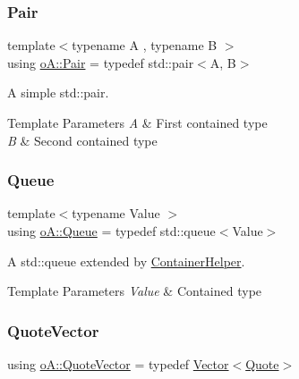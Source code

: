 \mbox{\label{namespaceo_a_a2e4add9f777dcae3f5afde9e90c75b66}} 
\subsubsection{\texorpdfstring{Pair}{Pair}}
{\footnotesize\ttfamily template$<$typename A , typename B $>$ \\
using \mbox{\hyperlink{namespaceo_a_a2e4add9f777dcae3f5afde9e90c75b66}{o\+A\+::\+Pair}} = typedef std\+::pair$<$A, B$>$}



A simple std\+::pair. 


\begin{DoxyTemplParams}{Template Parameters}
{\em A} & First contained type \\
\hline
{\em B} & Second contained type \\
\hline
\end{DoxyTemplParams}
\mbox{\label{namespaceo_a_a797c449312e4921e82e3f05a2562bb97}} 
\subsubsection{\texorpdfstring{Queue}{Queue}}
{\footnotesize\ttfamily template$<$typename Value $>$ \\
using \mbox{\hyperlink{namespaceo_a_a797c449312e4921e82e3f05a2562bb97}{o\+A\+::\+Queue}} = typedef std\+::queue$<$Value$>$}



A std\+::queue extended by \mbox{\hyperlink{classo_a_1_1_container_helper}{Container\+Helper}}. 


\begin{DoxyTemplParams}{Template Parameters}
{\em Value} & Contained type \\
\hline
\end{DoxyTemplParams}
\mbox{\label{namespaceo_a_a38695044d9ec0b57190f4e3fab0caffd}} 
\subsubsection{\texorpdfstring{Quote\+Vector}{QuoteVector}}
{\footnotesize\ttfamily using \mbox{\hyperlink{namespaceo_a_a38695044d9ec0b57190f4e3fab0caffd}{o\+A\+::\+Quote\+Vector}} = typedef \mbox{\hyperlink{namespaceo_a_a10997b8f468dc32c0a3e5e2ff56c57c1}{Vector}}$<$\mbox{\hyperlink{classo_a_1_1_quote}{Quote}}$>$}

